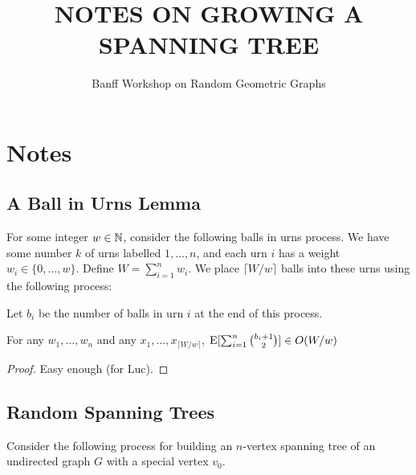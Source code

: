 \documentclass[lotsofwhite]{patmorin}
\title{\MakeUppercase{Notes on Growing a Spanning Tree}}
\author{Banff Workshop on Random Geometric Graphs}
\begin{document}
\maketitle

\section{Notes}


\subsection{A Ball in Urns Lemma}

For some integer $w\in\mathbb{N}$, consider the following balls in urns process.
We have some number $k$ of urns labelled $1,\ldots,n$, and each urn
$i$ has a weight $w_i\in\{0,\ldots,w\}$.  Define $W=\sum_{i=1}^n w_i$.
We place $\lceil W/w\rceil$ balls into these urns using the following
process:

\noindent
\begin{algorithmic}
   \ENDFOR
\end{algorithmic}
\noindent
Let $b_i$ be the number of balls in urn $i$ at the end of this process.

\begin{lem}
   For any $w_1,\ldots,w_n$ and any $x_1,\ldots,x_{\lceil W/w\rceil}$,
   $\mathrm{E}[\sum_{i=1}^n \binom{b_i+1}{2}] \in O(W/w)$
\end{lem}

\begin{proof}
Easy enough (for Luc).
\end{proof}

\subsection{Random Spanning Trees}

Consider the following process for building an $n$-vertex spanning tree
of an undirected graph $G$ with a special vertex $v_0$.

\noindent
\begin{algorithmic}
  \ENDFOR
\end{algorithmic}
\end{document}
